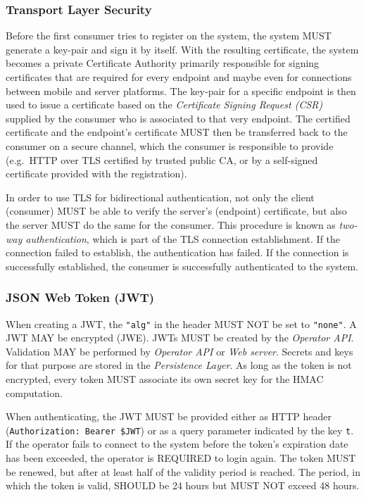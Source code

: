 \documentclass[12pt,english,a4paper,titlepage,cleardoublepage=empty,dottedtoc]{report}
\begin{document}
\subsubsection{Transport Layer Security}\label{transport-layer-security}

Before the first consumer tries to register on the system, the system
MUST generate a key-pair and sign it by itself. With the resulting
certificate, the system becomes a private Certificate Authority
primarily responsible for signing certificates that are required for
every endpoint and maybe even for connections between mobile and server
platforms. The key-pair for a specific endpoint is then used to issue a
certificate based on the \emph{Certificate Signing Request (CSR)}
supplied by the consumer who is associated to that very endpoint. The
certified certificate and the endpoint's certificate MUST then be
transferred back to the consumer on a secure channel, which the consumer
is responsible to provide (e.g.~HTTP over TLS certified by trusted
public CA, or by a self-signed certificate provided with the
registration).

In order to use TLS for bidirectional authentication, not only the
client (consumer) MUST be able to verify the server's (endpoint)
certificate, but also the server MUST do the same for the consumer. This
procedure is known as \emph{two-way authentication}, which is part of
the TLS connection establishment. If the connection failed to establish,
the authentication has failed. If the connection is successfully
established, the consumer is successfully authenticated to the system.

\subsubsection{JSON Web Token (JWT)}\label{json-web-token-jwt}

When creating a JWT, the \texttt{"alg"} in the header MUST NOT be set to
\texttt{"none"}. A JWT MAY be encrypted (JWE). JWTs MUST be created by
the \emph{Operator API}. Validation MAY be performed by \emph{Operator
API} or \emph{Web server}. Secrets and keys for that purpose are stored
in the \emph{Persistence Layer}. As long as the token is not encrypted,
every token MUST associate its own secret key for the HMAC computation.

When authenticating, the JWT MUST be provided either as HTTP header
(\texttt{Authorization:\ Bearer\ \$JWT}) or as a query parameter
indicated by the key \texttt{t}. If the operator fails to connect to the
system before the token's expiration date has been exceeded, the
operator is REQUIRED to login again. The token MUST be renewed, but
after at least half of the validity period is reached. The period, in
which the token is valid, SHOULD be 24 hours but MUST NOT exceed 48
hours.
\end{document}
